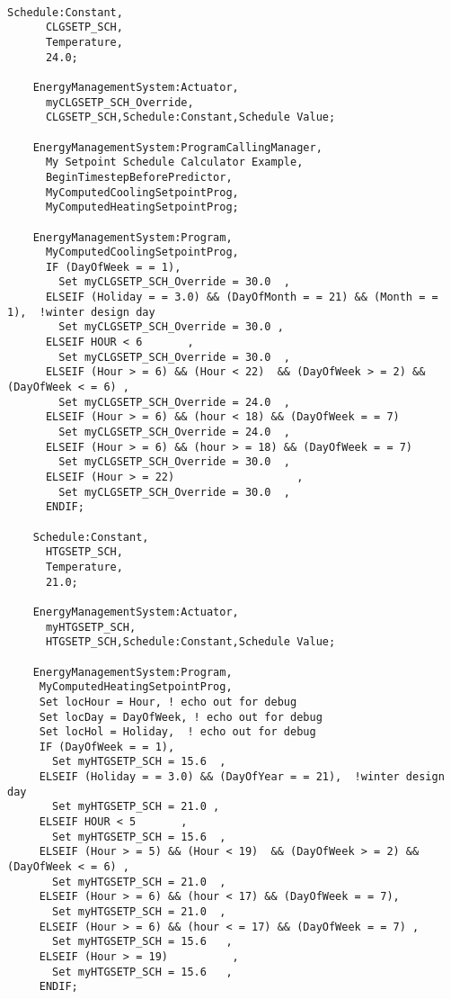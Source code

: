 \begin{lstlisting}

Schedule:Constant,
      CLGSETP_SCH,
      Temperature,
      24.0;

    EnergyManagementSystem:Actuator,
      myCLGSETP_SCH_Override,
      CLGSETP_SCH,Schedule:Constant,Schedule Value;

    EnergyManagementSystem:ProgramCallingManager,
      My Setpoint Schedule Calculator Example,
      BeginTimestepBeforePredictor,
      MyComputedCoolingSetpointProg,
      MyComputedHeatingSetpointProg;

    EnergyManagementSystem:Program,
      MyComputedCoolingSetpointProg,
      IF (DayOfWeek = = 1),
        Set myCLGSETP_SCH_Override = 30.0  ,
      ELSEIF (Holiday = = 3.0) && (DayOfMonth = = 21) && (Month = = 1),  !winter design day
        Set myCLGSETP_SCH_Override = 30.0 ,
      ELSEIF HOUR < 6       ,
        Set myCLGSETP_SCH_Override = 30.0  ,
      ELSEIF (Hour > = 6) && (Hour < 22)  && (DayOfWeek > = 2) && (DayOfWeek < = 6) ,
        Set myCLGSETP_SCH_Override = 24.0  ,
      ELSEIF (Hour > = 6) && (hour < 18) && (DayOfWeek = = 7)
        Set myCLGSETP_SCH_Override = 24.0  ,
      ELSEIF (Hour > = 6) && (hour > = 18) && (DayOfWeek = = 7)
        Set myCLGSETP_SCH_Override = 30.0  ,
      ELSEIF (Hour > = 22)                   ,
        Set myCLGSETP_SCH_Override = 30.0  ,
      ENDIF;

    Schedule:Constant,
      HTGSETP_SCH,
      Temperature,
      21.0;

    EnergyManagementSystem:Actuator,
      myHTGSETP_SCH,
      HTGSETP_SCH,Schedule:Constant,Schedule Value;

    EnergyManagementSystem:Program,
     MyComputedHeatingSetpointProg,
     Set locHour = Hour, ! echo out for debug
     Set locDay = DayOfWeek, ! echo out for debug
     Set locHol = Holiday,  ! echo out for debug
     IF (DayOfWeek = = 1),
       Set myHTGSETP_SCH = 15.6  ,
     ELSEIF (Holiday = = 3.0) && (DayOfYear = = 21),  !winter design day
       Set myHTGSETP_SCH = 21.0 ,
     ELSEIF HOUR < 5       ,        
       Set myHTGSETP_SCH = 15.6  ,
     ELSEIF (Hour > = 5) && (Hour < 19)  && (DayOfWeek > = 2) && (DayOfWeek < = 6) ,
       Set myHTGSETP_SCH = 21.0  ,
     ELSEIF (Hour > = 6) && (hour < 17) && (DayOfWeek = = 7),
       Set myHTGSETP_SCH = 21.0  ,
     ELSEIF (Hour > = 6) && (hour < = 17) && (DayOfWeek = = 7) ,
       Set myHTGSETP_SCH = 15.6   ,
     ELSEIF (Hour > = 19)          ,
       Set myHTGSETP_SCH = 15.6   ,
     ENDIF;
\end{lstlisting}
